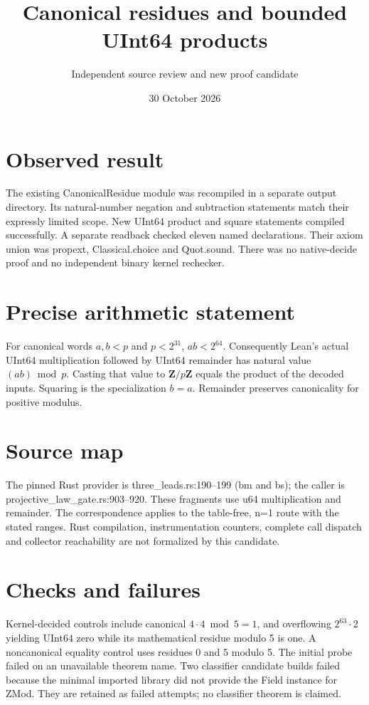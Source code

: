 \documentclass[11pt]{article}
\begin{document}
\title{Canonical residues and bounded UInt64 products}
\author{Independent source review and new proof candidate}
\date{30 October 2026}\maketitle
\section*{Observed result}
The existing CanonicalResidue module was recompiled in a separate output directory. Its natural-number negation and subtraction statements match their expressly limited scope. New UInt64 product and square statements compiled successfully. A separate readback checked eleven named declarations. Their axiom union was propext, Classical.choice and Quot.sound. There was no native-decide proof and no independent binary kernel rechecker.
\section*{Precise arithmetic statement}
For canonical words $a,b<p$ and $p<2^{31}$, $ab<2^{64}$. Consequently Lean's actual UInt64 multiplication followed by UInt64 remainder has natural value $(ab)\bmod p$. Casting that value to $\mathbf Z/p\mathbf Z$ equals the product of the decoded inputs. Squaring is the specialization $b=a$. Remainder preserves canonicality for positive modulus.
\section*{Source map}
The pinned Rust provider is three\_leads.rs:190--199 (bm and bs); the caller is projective\_law\_gate.rs:903--920. These fragments use u64 multiplication and remainder. The correspondence applies to the table-free, n=1 route with the stated ranges. Rust compilation, instrumentation counters, complete call dispatch and collector reachability are not formalized by this candidate.
\section*{Checks and failures}
Kernel-decided controls include canonical $4\cdot4\bmod5=1$, and overflowing $2^{63}\cdot2$ yielding UInt64 zero while its mathematical residue modulo 5 is one. A noncanonical equality control uses residues 0 and 5 modulo 5. The initial probe failed on an unavailable theorem name. Two classifier candidate builds failed because the minimal imported library did not provide the Field instance for ZMod. They are retained as failed attempts; no classifier theorem is claimed.
\end{document}
